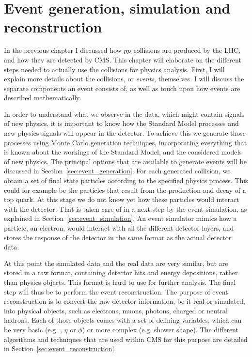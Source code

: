 \chapter[Event generation, simulation, reconstruction]{Event generation, simulation and
reconstruction \label{chap:event_generation}}

In the previous chapter I discussed how ${p}{p}$ collisions are produced by the LHC, and
how they are detected by CMS. This chapter will elaborate on the different
steps needed to actually use the collisions for physics analysis. 
First, I will explain more details about the collisions, or \textit{events}, themselves. I will
discuss the separate components an event consists of, as well as touch upon how events are described
mathematically. 

In order to understand what we observe in the data, which might contain signals of new physics, it
is important to know how the Standard Model processes and new physics signals will appear in the
detector. To achieve this we generate those processes using Monte Carlo generation techniques,
incorporating everything that is known about the workings of the Standard Model, and the
considered models of new physics. 
The principal options that are available to generate
events will be discussed in Section~\ref{sec:event_generation}. 
For each generated collision, we obtain a set of final state particles according to the specified
physics process. This could for example be the particles that result from the production and decay
of a top quark. 
At this stage we do not know yet how these particles would interact with the detector. That is
taken care of in a next step by the event simulation, as explained in
Section~\ref{sec:event_simulation}. An event simulator mimics how a particle, \eg an electron,
would interact with all the different detector layers, and stores the response of the detector in
the same format as the actual detector data. 

At this point the simulated data and the real data are very similar, but are stored in a raw format,
containing detector hits and energy depositions, rather than physics objects. This format is hard to
use for further analysis. The final step will thus be to perform the event reconstruction. The
purpose of event reconstruction is to convert the raw detector information, be it real or simulated,
into physical objects, such as electrons, muons, photons, charged or neutral hadrons. Each of those
objects comes with a set of defining variables, which can be very basic (e.g. \pt, $\eta$ or $\phi$)
or more complex (e.g. shower shape). The different algorithms and techniques that are used within
CMS for this purpose are detailed in Section~\ref{sec:event_reconstruction}. 

